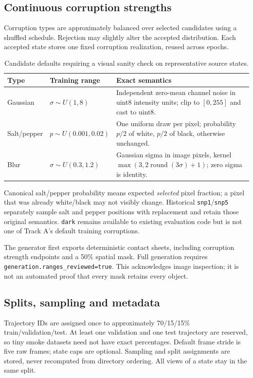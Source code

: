 \documentclass[11pt,a4paper]{article}
\newcommand{\code}[1]{\nolinkurl{#1}}
\begin{document}
\subsection{Continuous corruption strengths}
Corruption types are approximately balanced over selected candidates using a
shuffled schedule. Rejection may slightly alter the accepted distribution.
Each accepted state stores one fixed corruption realization, reused across epochs.
\begin{table}[htbp]\centering\small
\begin{tabularx}{\linewidth}{l l X}
\toprule Type & Training range & Exact semantics \\\midrule
Gaussian & $\sigma\sim U(1,8)$ & Independent zero-mean channel noise in uint8 intensity units; clip to $[0,255]$ and cast to uint8. \\
Salt/pepper & $p\sim U(0.001,0.02)$ & One uniform draw per pixel; probability $p/2$ of white, $p/2$ of black, otherwise unchanged. \\
Blur & $\sigma\sim U(0.3,1.2)$ & Gaussian sigma in image pixels, kernel $\max(3,2\operatorname{round}(3\sigma)+1)$; zero sigma is identity. \\
\bottomrule
\end{tabularx}
\caption{Candidate defaults requiring a visual sanity check on representative source states.}
\end{table}
Canonical salt/pepper probability means expected \emph{selected} pixel fraction;
a pixel that was already white/black may not visibly change. Historical
\code{snp1}/\code{snp5} separately sample salt and pepper positions with replacement
and retain those original semantics. \code{dark} remains available to existing
evaluation code but is not one of Track A's default training corruptions.

The generator first exports deterministic contact sheets, including corruption
strength endpoints and a 50\% spatial mask. Full generation requires
\code{generation.ranges_reviewed=true}. This acknowledges image inspection; it is
not an automated proof that every mask retains every object.

\subsection{Splits, sampling and metadata}
Trajectory IDs are assigned once to approximately 70/15/15\% train/validation/test.
At least one validation and one test trajectory are reserved, so tiny smoke
datasets need not have exact percentages. Default frame stride is five raw frames;
state caps are optional. Sampling and split assignments are stored, never recomputed
from directory ordering. All views of a state stay in the same split.
\end{document}
